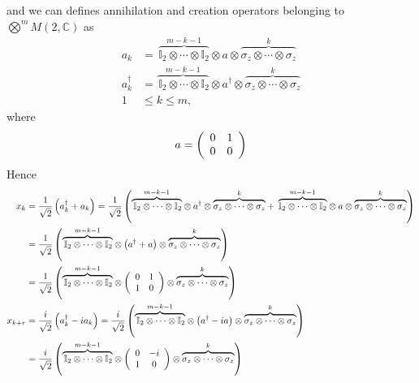 \documentclass[aps,preprint]{revtex4}%
\begin{document}
and we can defines annihilation and creation operators belonging to $%
{\displaystyle\bigotimes\limits^{m}}
M\left(  2,\mathbb{C}\right)  $ as
\begin{align}
a_{k}  &  =\,\overset{m-k-1}{\overbrace{\mathbb{I}_{2}\otimes\cdots
\otimes\mathbb{I}_{2}}}\otimes a\otimes\overset{k}{\overbrace{\mathbb{\sigma
}_{z}\otimes\cdots\otimes\mathbb{\sigma}_{z}}}\nonumber\\
a_{k}^{\dagger}  &  =\overset{m-k-1}{\overbrace{\,\mathbb{I}_{2}\otimes
\cdots\otimes\mathbb{I}_{2}}}\otimes a^{\dagger}\otimes
\overset{k}{\overbrace{\mathbb{\sigma}_{z}\otimes\cdots\otimes\mathbb{\sigma
}_{z}}}\nonumber\\
1  &  \leq k\leq m,
\end{align}
where
\begin{equation}
a=\left(
\begin{array}
[c]{cc}%
0 & 1\\
0 & 0
\end{array}
\right)
\end{equation}
Hence
\begin{align}
x_{k}  &  =\frac{1}{\sqrt{2}}\left(  a_{k}^{\dagger}+a_{k}\right)  =\frac
{1}{\sqrt{2}}\left(  \overset{m-k-1}{\overbrace{\,\mathbb{I}_{2}\otimes
\cdots\otimes\mathbb{I}_{2}}}\otimes a^{\dagger}\otimes
\overset{k}{\overbrace{\mathbb{\sigma}_{z}\otimes\cdots\otimes\mathbb{\sigma
}_{z}}}+\,\overset{m-k-1}{\overbrace{\mathbb{I}_{2}\otimes\cdots
\otimes\mathbb{I}_{2}}}\otimes a\otimes\overset{k}{\overbrace{\mathbb{\sigma
}_{z}\otimes\cdots\otimes\mathbb{\sigma}_{z}}}\right) \\
&  =\frac{1}{\sqrt{2}}\left(  \overset{m-k-1}{\overbrace{\,\mathbb{I}%
_{2}\otimes\cdots\otimes\mathbb{I}_{2}}}\otimes\left(  a^{\dagger}+a\right)
\otimes\overset{k}{\overbrace{\mathbb{\sigma}_{z}\otimes\cdots\otimes
\mathbb{\sigma}_{z}}}\right) \\
&  =\frac{1}{\sqrt{2}}\left(  \overset{m-k-1}{\overbrace{\,\mathbb{I}%
_{2}\otimes\cdots\otimes\mathbb{I}_{2}}}\otimes\left(
\begin{array}
[c]{cc}%
0 & 1\\
1 & 0
\end{array}
\right)  \otimes\overset{k}{\overbrace{\mathbb{\sigma}_{z}\otimes\cdots
\otimes\mathbb{\sigma}_{z}}}\right) \\
x_{k+r}  &  =\frac{i}{\sqrt{2}}\left(  a_{k}^{\dagger}-ia_{k}\right)
=\frac{i}{\sqrt{2}}\left(  \overset{m-k-1}{\overbrace{\,\mathbb{I}_{2}%
\otimes\cdots\otimes\mathbb{I}_{2}}}\otimes\left(  a^{\dagger}-ia\right)
\otimes\overset{k}{\overbrace{\mathbb{\sigma}_{z}\otimes\cdots\otimes
\mathbb{\sigma}_{z}}}\right) \\
&  =\frac{i}{\sqrt{2}}\left(  \overset{m-k-1}{\overbrace{\,\mathbb{I}%
_{2}\otimes\cdots\otimes\mathbb{I}_{2}}}\otimes\left(
\begin{array}
[c]{cc}%
0 & -i\\
1 & 0
\end{array}
\right)  \otimes\overset{k}{\overbrace{\mathbb{\sigma}_{z}\otimes\cdots
\otimes\mathbb{\sigma}_{z}}}\right)
\end{align}
\end{document}
